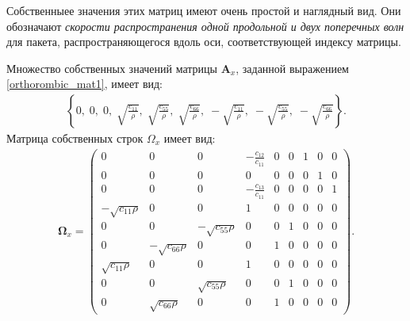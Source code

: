 	Собственныее значения этих матриц имеют очень простой и наглядный вид.
	Они обозначают \textit{скорости распространения одной продольной и двух поперечных волн} для пакета, распространяющегося вдоль оси, соответствующей индексу матрицы.
	
	Множество собственных значений матрицы $\mathbf{A}_x$, заданной выражением \eqref{orthorombic_mat1}, имеет вид:
\begin{align}
	\left\{0,\;0,\;0,\;\sqrt{\frac{c_{11}}{\rho}},\;\sqrt{\frac{c_{55}}{\rho}},\;\sqrt{\frac{c_{66}}{\rho}},\;-\sqrt{\frac{c_{11}}{\rho}},\;-\sqrt{\frac{c_{55}}{\rho}},\;-\sqrt{\frac{c_{66}}{\rho}}\right\}.
\end{align}
	Матрица собственных строк $\Omega_x$ имеет вид:
\begin{align}
\mathbf{\Omega}_x =
\left( \begin{array}{cccccccccccc}
0 & 0 & 0 & -\frac{c_{12}}{c_{11}} & 0 & 0 & 1 & 0 & 0 \\ 
0 & 0 & 0 & 0 & 0 & 0 & 0 & 1 & 0 \\ 
0 & 0 & 0 & -\frac{c_{13}}{c_{11}} & 0 & 0 & 0 & 0 & 1 \\ 
-\sqrt{c_{11}\rho} & 0 & 0 & 1 & 0 & 0 & 0 & 0 & 0 \\ 
0 & 0 & -\sqrt{c_{55}\rho} & 0 & 0 & 1 & 0 & 0 & 0 \\
0 & -\sqrt{c_{66}\rho} & 0 & 0 & 1 & 0 & 0 & 0 & 0 \\ 
\sqrt{c_{11}\rho} & 0 & 0 & 1 & 0 & 0 & 0 & 0 & 0 \\ 
0 & 0 & \sqrt{c_{55}\rho} & 0 & 0 & 1 & 0 & 0 & 0 \\ 
0 & \sqrt{c_{66}\rho} & 0 & 0 & 1 & 0 & 0 & 0 & 0
\end{array} \right).
\end{align}

